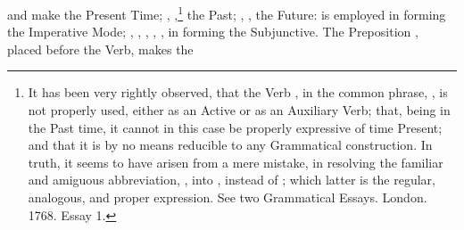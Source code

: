  and  make the Present Time; ,
,\footnote{It has been very rightly observed, that the Verb
  , in the common phrase, , is not properly
  used, either as an Active or as an Auxiliary Verb; that, being in the
  Past time, it cannot in this case be properly expressive of time
  Present; and that it is by no means reducible to any Grammatical
  construction. In truth, it seems to have arisen from a mere mistake,
  in resolving the familiar and amiguous abbreviation, ,
  into , instead of ; which latter
  is the regular, analogous, and proper expression. See two Grammatical
  Essays. London. 1768. Essay 1.} the Past; , , the
Future:  is employed in forming the Imperative Mode; ,
, , , , in forming the
Subjunctive. The Preposition , placed before the Verb, makes the
